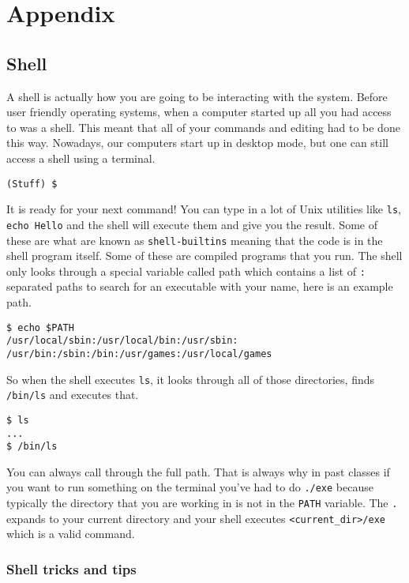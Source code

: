 \chapter{Appendix}

\section{Shell}

A shell is actually how you are going to be interacting with the system. Before user friendly operating systems, when a computer started up all you had access to was a shell. This meant that all of your commands and editing had to be done this way. Nowadays, our computers start up in desktop mode, but one can still access a shell using a terminal.

\begin{verbatim}
(Stuff) $
\end{verbatim}

It is ready for your next command! You can type in a lot of Unix utilities like \texttt{ls}, \texttt{echo\ Hello} and the shell will execute them and give you the result. Some of these are what are known as \texttt{shell-builtins} meaning that the code is in the shell program itself. Some of these are compiled programs that you run. The shell only looks through a special variable called path which contains a list of \texttt{:} separated paths to search for an executable with your name, here is an example path.

\begin{verbatim}
$ echo $PATH
/usr/local/sbin:/usr/local/bin:/usr/sbin:
/usr/bin:/sbin:/bin:/usr/games:/usr/local/games
\end{verbatim}

So when the shell executes \texttt{ls}, it looks through all of those directories, finds \texttt{/bin/ls} and executes that.

\begin{verbatim}
$ ls
...
$ /bin/ls
\end{verbatim}

You can always call through the full path. That is always why in past classes if you want to run something on the terminal you've had to do \texttt{./exe} because typically the directory that you are working in is not in the \texttt{PATH} variable. The \texttt{.} expands to your current directory and your shell executes \texttt{\textless{}current\_dir\textgreater{}/exe} which is a valid command.

\subsection{Shell tricks and tips}

